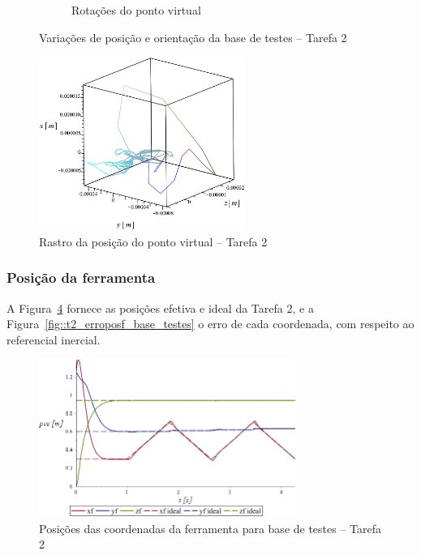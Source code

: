 \begin{figure}[h]
\begin{subfigure}[b]{0.48\textwidth}
        \caption{Rotações do ponto virtual}
        \label{fig::t2_q456_base_testes}
    \end{subfigure}
    \caption{Variações de posição e orientação da base de testes -- Tarefa 2}
    \label{fig::t2_q123456_base_testes}
\end{figure}

\begin{figure}[h!]
	\centering 
 	\includegraphics[width=0.60\textwidth]{figs/t2_pvirtural_base_testes}
 	\caption{Rastro da posição do ponto virtual -- Tarefa 2}
 	\label{fig::t2_pvirtural_base_testes}
\end{figure}


\subsubsection{Posição da ferramenta}

A Figura~\ref{fig::t2_posf_base_testes} fornece as posições efetiva e ideal da
Tarefa 2, e a Figura~\ref{fig::t2_erroposf_base_testes} o erro de cada
coordenada, com respeito ao referencial inercial.

\begin{figure}[h!]
	\centering 
 	\includegraphics[width=0.75\textwidth]{figs/t2_posf_base_testes}
 	\caption{Posições das coordenadas da ferramenta para base de testes -- Tarefa
 	2}
 	\label{fig::t2_posf_base_testes}
\end{figure}

